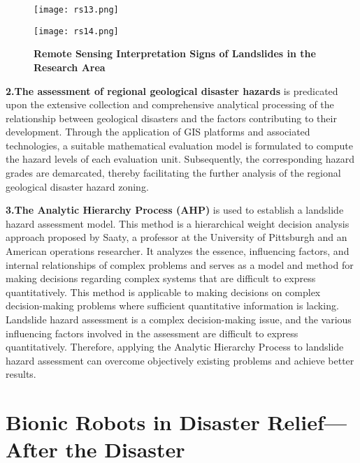 \documentclass[conference]{IEEEtran}
\begin{document}
\begin{figure}[h]
    \centering
    \begin{minipage}{0.49\linewidth}
        \centering
        \texttt{[image: rs13.png]}
        \label{a}
    \end{minipage}
    \begin{minipage}{0.49\linewidth}
        \centering
        \texttt{[image: rs14.png]}
        \label{b}
    \end{minipage}
    \caption{\textbf{Remote Sensing Interpretation Signs of Landslides in the Research Area}}
\end{figure}

\textbf{2.The assessment of regional geological disaster hazards} is predicated upon the extensive collection and comprehensive analytical processing of the relationship between geological disasters and the factors contributing to their development. Through the application of GIS platforms and associated technologies, a suitable mathematical evaluation model is formulated to compute the hazard levels of each evaluation unit\cite{b77}. Subsequently, the corresponding hazard grades are demarcated, thereby facilitating the further analysis of the regional geological disaster hazard zoning. 

\textbf{3.The Analytic Hierarchy Process (AHP)} is used to establish a landslide hazard assessment model\cite{b78}. This method is a hierarchical weight decision analysis approach proposed by Saaty, a professor at the University of Pittsburgh and an American operations researcher. It analyzes the essence, influencing factors, and internal relationships of complex problems and serves as a model and method for making decisions regarding complex systems that are difficult to express quantitatively. This method is applicable to making decisions on complex decision-making problems where sufficient quantitative information is lacking. Landslide hazard assessment is a complex decision-making issue, and the various influencing factors involved in the assessment are difficult to express quantitatively. Therefore, applying the Analytic Hierarchy Process to landslide hazard assessment can overcome objectively existing problems and achieve better results. 

\section{\textbf{Bionic Robots in Disaster Relief---After the Disaster}}
\end{document}
